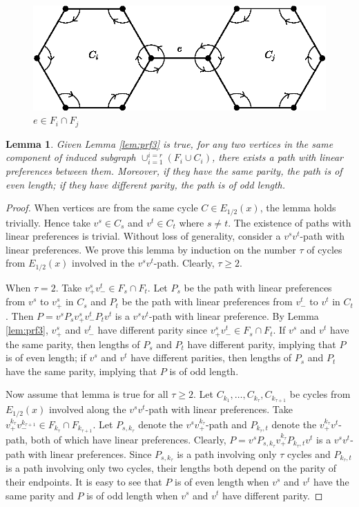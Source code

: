 \documentclass[11pt]{article}
\newtheorem{lemma}[theorem]{Lemma}
\numberwithin{theorem}{section}
\begin{document}
\begin{figure}
\centering
\includegraphics[scale=0.85]{KernelMengerianO-fig2}
\caption{$e\in F_i\cap F_j$}
\end{figure}

\begin{lemma}
\label{lem:prf4}
Given Lemma \ref{lem:prf3} is true, for any two vertices in the same component of induced subgraph $\cup_{i=1}^{i=r}(F_i\cup C_i)$, there exists a path with linear preferences between them. Moreover, if they have the same parity, the path is of even length; if they have different parity, the path is of odd length. 
\end{lemma}
\begin{proof}
When vertices are from the same cycle $C\in E_{1/2}(x)$, the lemma holds trivially. Hence take $v^s \in C_s$ and $v^t\in C_t$ where $s\not=t$. The existence of paths with linear preferences is trivial. Without loss of generality, consider a $v^s v^t$-path with linear preferences. We prove this lemma by induction on the number $\tau$ of cycles from $E_{1/2}(x)$ involved in the $v^s v^t$-path. Clearly, $\tau\geq 2$.

When $\tau=2$. Take $v^s_+ v^t_-\in F_s\cap F_t$. Let $P_s$ be the path with linear preferences from $v^s$ to $v^s_+$ in $C_s$ and $P_t$ be the path with linear preferences from $v^t_-$ to $v^t$ in $C_t$. Then $P=v^sP_s v^s_+ v^t_- P_t v^t$ is a $v^s v^t$-path with linear preference. By Lemma \ref{lem:prf3}, $v^s_+$ and $v^t_-$ have different parity since $v^s_+ v^t_-\in F_s\cap F_t$. If $v^s$ and $v^t$ have the same parity, then lengths of $P_s$ and $P_t$ have different parity, implying that $P$ is of even length; if $v^s$ and $v^t$ have different parities, then lengths of $P_s$ and $P_t$ have the same parity, implying that $P$ is of odd length.

Now assume that lemma is true for all $\tau\geq 2$. Let $C_{k_1},\ldots,C_{k_\tau},C_{k_{\tau+1}}$ be cycles from $E_{1/2}(x)$ involved along the $v^s v^t$-path with linear preferences. Take $v^{k_{\tau}}_+ v^{k_{\tau+1}}_- \in F_{k_{\tau}}\cap F_{k_{\tau+1}}$. Let $P_{s, k_{\tau}}$ denote the $v^s v^{k_{\tau}}_+$-path and $P_{k_{\tau},t}$ denote the $v^{k_{\tau}}_+ v^t$-path, both of which have linear preferences. Clearly, $P=v^sP_{s,k_\tau} v^{k_\tau}_+ P_{k_\tau, t} v^t$ is a $v^s v^t$-path with linear preferences. Since $P_{s, k_{\tau}}$ is a path involving only $\tau$ cycles and $P_{k_{\tau},t}$ is a path involving only two cycles, their lengths both depend on the parity of their endpoints. It is easy to see that $P$ is of even length when $v^s$ and $v^t$ have the same parity and $P$ is of odd length when $v^s$ and $v^t$ have different parity.
\end{proof}
\end{document}
